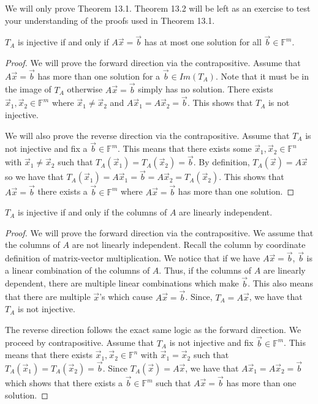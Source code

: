 We will only prove Theorem 13.1. Theorem 13.2 will be left as an exercise to test your understanding of the proofs used in Theorem 13.1.
\begin{lemma}
    $T_A$ is injective if and only if $A\vec{x}=\vec{b}$ has at most one solution for all $\vec{b}\in\mathbb{F}^m$.
\end{lemma}
\begin{proof}
    We will prove the forward direction via the contrapositive. Assume that $A\vec{x}=\vec{b}$ has more than one solution for a $\vec{b}\in Im(T_A)$. Note that it must be in the image of $T_A$ otherwise $A\vec{x}=\vec{b}$ simply has no solution. There exists $\vec{x}_1,\vec{x}_2\in\mathbb{F}^m$ where $\vec{x}_1\neq\vec{x}_2$ and $A\vec{x}_1=A\vec{x}_2=\vec{b}$. This shows that $T_A$ is not injective.

    We will also prove the reverse direction via the contrapositive. Assume that $T_A$ is not injective and fix a $\vec{b}\in\mathbb{F}^m$. This means that there exists some $\vec{x}_1,\vec{x}_2\in\mathbb{F}^n$ with $\vec{x}_1\neq\vec{x}_2$ such that $T_A(\vec{x}_1)=T_A(\vec{x}_2)=\vec{b}$. By definition, $T_A(\vec{x})=A\vec{x}$ so we have that $T_A(\vec{x}_1)=A\vec{x}_1=\vec{b}=A\vec{x}_2=T_A(\vec{x}_2)$. This shows that $A\vec{x}=\vec{b}$ there exists a $\vec{b}\in\mathbb{F}^m$ where $A\vec{x}=\vec{b}$ has more than one solution.
\end{proof}
\begin{lemma}
    $T_A$ is injective if and only if the columns of $A$ are linearly independent.
\end{lemma}
\begin{proof}
    We will prove the forward direction via the contrapositive. We assume that the columns of $A$ are not linearly independent. Recall the column by coordinate definition of matrix-vector multiplication. We notice that if we have $A\vec{x}=\vec{b}$, $\vec{b}$ is a linear combination of the columns of $A$. Thus, if the columns of $A$ are linearly dependent, there are multiple linear combinations which make $\vec{b}$. This also means that there are multiple $\vec{x}$'s which cause $A\vec{x}=\vec{b}$. Since, $T_A=A\vec{x}$, we have that $T_A$ is not injective.

    The reverse direction follows the exact same logic as the forward direction. We proceed by contrapositive. Assume that $T_A$ is not injective and fix $\vec{b}\in\mathbb{F}^m$. This means that there exists $\vec{x}_1,\vec{x}_2\in\mathbb{F}^n$ with $\vec{x}_1=\vec{x}_2$ such that $T_A(\vec{x}_1)=T_A(\vec{x}_2)=\vec{b}$. Since $T_A(\vec{x})=A\vec{x}$, we have that $A\vec{x}_1=A\vec{x}_2=\vec{b}$ which shows that there exists a $\vec{b}\in\mathbb{F}^m$ such that $A\vec{x}=\vec{b}$ has more than one solution.
\end{proof}
